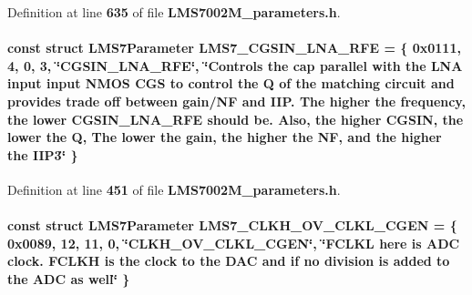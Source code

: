 Definition at line {\bf 635} of file {\bf L\+M\+S7002\+M\+\_\+parameters.\+h}.

\paragraph[{L\+M\+S7\+\_\+\+C\+G\+S\+I\+N\+\_\+\+L\+N\+A\+\_\+\+R\+FE}]{\setlength{\rightskip}{0pt plus 5cm}const struct {\bf L\+M\+S7\+Parameter} L\+M\+S7\+\_\+\+C\+G\+S\+I\+N\+\_\+\+L\+N\+A\+\_\+\+R\+FE = \{ 0x0111, 4, 0, 3, \char`\"{}\+C\+G\+S\+I\+N\+\_\+\+L\+N\+A\+\_\+\+R\+F\+E\char`\"{}, \char`\"{}\+Controls the cap parallel with the L\+N\+A input input N\+M\+O\+S C\+G\+S to control the Q of the matching circuit and provides trade off between gain/\+N\+F and I\+I\+P. The higher the frequency, the lower C\+G\+S\+I\+N\+\_\+\+L\+N\+A\+\_\+\+R\+F\+E should be. Also, the higher C\+G\+S\+I\+N, the lower the Q, The lower the gain, the higher the N\+F, and the higher the I\+I\+P3\char`\"{} \}\hspace{0.3cm}{\ttfamily [static]}}\label{LMS7002M__parameters_8h_a8b5a6f797bf93048bc22a99ca4178e8e}


Definition at line {\bf 451} of file {\bf L\+M\+S7002\+M\+\_\+parameters.\+h}.

\paragraph[{L\+M\+S7\+\_\+\+C\+L\+K\+H\+\_\+\+O\+V\+\_\+\+C\+L\+K\+L\+\_\+\+C\+G\+EN}]{\setlength{\rightskip}{0pt plus 5cm}const struct {\bf L\+M\+S7\+Parameter} L\+M\+S7\+\_\+\+C\+L\+K\+H\+\_\+\+O\+V\+\_\+\+C\+L\+K\+L\+\_\+\+C\+G\+EN = \{ 0x0089, 12, 11, 0, \char`\"{}\+C\+L\+K\+H\+\_\+\+O\+V\+\_\+\+C\+L\+K\+L\+\_\+\+C\+G\+E\+N\char`\"{}, \char`\"{}\+F\+C\+L\+K\+L here is A\+D\+C clock. F\+C\+L\+K\+H is the clock to the D\+A\+C and if no division is added to the A\+D\+C as well\char`\"{} \}\hspace{0.3cm}{\ttfamily [static]}}\label{LMS7002M__parameters_8h_a62f95db461ce2bfe2ca39f92ae3d488e}


